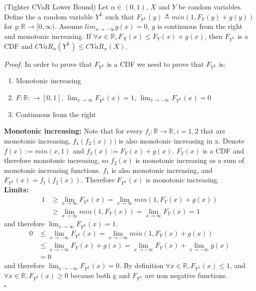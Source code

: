 \documentclass[10pt,a4paper]{amsart}
\newenvironment{proof}{\noindent\textit{Proof.}}{\hfill$\square$}
\begin{document}
\begin{theorem}\label{thm:tight_cvar_lower_bound}
	(Tighter CVaR Lower Bound) Let $\alpha \in (0,1)$, $X$ and $Y$ be random variables. Define the a random variable $Y^L$ such that $F_{Y^L}(y) \triangleq min(1, F_Y(y) + g(y))$ for $g:\mathbb{R}\rightarrow [0, \infty)$. Assume 
	$lim_{x \rightarrow -\infty}g(x)=0$, $g$ is continuous from the right and monotonic increasing.
	If $\forall x\in \mathbb{R}, F_X(x)\leq F_Y(x)+g(x)$, then $F_{Y^L}$ is a CDF and $CVaR_\alpha(Y^L)\leq CVaR_\alpha(X).$
\end{theorem}

\begin{proof}
	In order to prove that $F_{Y^L}$ is a CDF we need to prove that $F_{Y^L}$ is:
	\begin{enumerate}
		\item Monotonic increasing
		\item $F:\mathbb{R}:\rightarrow [0,1]$, $\lim_{x\rightarrow \infty}F_{Y^L}(x)=1$, $\lim_{x\rightarrow -\infty}F_{Y^L}(x)=0$
		\item Continuous from the right
	\end{enumerate}
	
	\textbf{Monotonic increasing:}
	Note that for every $f_i:\mathbb{R}\rightarrow \mathbb{R}, i=1,2$ that are monotonic increasing, $f_1(f_2(x)))$ is also monotonic increasing in x. Denote $f(x):=min(x,1)$ and $f_2(x):=F_Y(x)+g(x)$. $F_Y(x)$ is a CDF and therefore monotonic increasing, so $f_2(x)$ is monotonic increasing as a sum of monotonic increasing functions. $f_1$ is also monotonic increasing, and $F_{Y^L}(x)=f_1(f_2(x))$. Therefore $F_{Y^L}(x)$ is monotonic increasing. \\
	
	\textbf{Limits:} \begin{equation}
		\begin{aligned}
			1&\geq\lim_{x\rightarrow \infty} F_{Y^L}(x)=\lim_{x\rightarrow \infty} min(1,F_Y(x)+g(x)) \\
			&\geq \lim_{x\rightarrow \infty}min(1,F_Y(x))=\lim_{x\rightarrow \infty} F_Y(x)=1
		\end{aligned}
	\end{equation}
	and therefore $\lim_{x\rightarrow \infty} F_{Y^L}(x)=1$.
	$$\begin{aligned}
		0&\leq \lim_{x\rightarrow -\infty} F_{Y^L}(x)=\lim_{x\rightarrow -\infty} min(1,F_Y(x)+g(x)) \\
		&\leq \lim_{x\rightarrow -\infty} F_Y(x)+g(x) 
		=\lim_{x\rightarrow -\infty} F_Y(x)+\lim_{x\rightarrow -\infty} g(x) \\
		&=0	
	\end{aligned}$$
	and therefore $\lim_{x\rightarrow -\infty} F_{Y^L}(x)=0$. By definition $\forall x\in \mathbb{R},F_{Y^L}(x)\leq 1$, and $\forall x\in \mathbb{R},F_{Y^L}(x)\geq 0$ because both g and $F_{Y^L}$ are non negative functions. \\
	

\end{proof}
\end{document}
